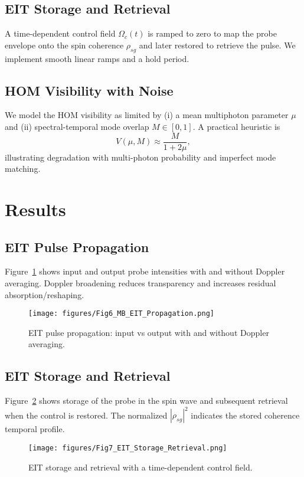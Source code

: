 \documentclass[11pt]{article}
\begin{document}
\subsection{EIT Storage and Retrieval}
A time-dependent control field $\Omega_c(t)$ is ramped to zero to map the probe envelope onto the spin coherence $\rho_{sg}$ and later restored to retrieve the pulse. We implement smooth linear ramps and a hold period.

\subsection{HOM Visibility with Noise}
We model the HOM visibility as limited by (i) a mean multiphoton parameter $\mu$ and (ii) spectral-temporal mode overlap $M\in[0,1]$. A practical heuristic is
\begin{equation}
V(\mu,M) \approx \frac{M}{1 + 2\mu},
\end{equation}
illustrating degradation with multi-photon probability and imperfect mode matching.

\section{Results}
\subsection{EIT Pulse Propagation}
Figure~\ref{fig:mb_propagation} shows input and output probe intensities with and without Doppler averaging. Doppler broadening reduces transparency and increases residual absorption/reshaping.

\begin{figure}[h]
\centering
\texttt{[image: figures/Fig6\_MB\_EIT\_Propagation.png]}
\caption{EIT pulse propagation: input vs output with and without Doppler averaging.}
\label{fig:mb_propagation}
\end{figure}

\subsection{EIT Storage and Retrieval}
Figure~\ref{fig:storage} shows storage of the probe in the spin wave and subsequent retrieval when the control is restored. The normalized $|\rho_{sg}|^2$ indicates the stored coherence temporal profile.

\begin{figure}[h]
\centering
\texttt{[image: figures/Fig7\_EIT\_Storage\_Retrieval.png]}
\caption{EIT storage and retrieval with a time-dependent control field.}
\label{fig:storage}
\end{figure}
\end{document}
